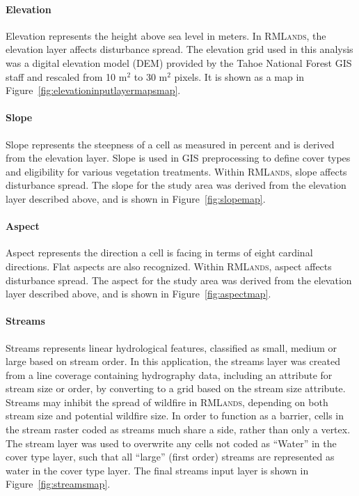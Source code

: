 \paragraph{Elevation} 
Elevation represents the height above sea level in meters. In \textsc{RMLands}, the elevation layer affects disturbance spread. The elevation grid used in this analysis was a digital elevation model (DEM) provided by the Tahoe National Forest GIS staff and rescaled from 10 m$^2$ to 30 m$^2$ pixels. It is shown as a map in Figure~\ref{fig:elevationinputlayermapsmap}.



\paragraph{Slope} 
Slope represents the steepness of a cell as measured in percent and is derived from the elevation layer. Slope is used in GIS preprocessing to define cover types and eligibility for various vegetation treatments. Within \textsc{RMLands}, slope affects disturbance spread. The slope for the study area was derived from the elevation layer described above, and is shown in Figure~\ref{fig:slopemap}.


\paragraph{Aspect} Aspect represents the direction a cell is facing in terms of eight cardinal directions. Flat aspects are also recognized. Within \textsc{RMLands}, aspect affects disturbance spread. The aspect for the study area was derived from the elevation layer described above, and is shown in Figure~\ref{fig:aspectmap}. 


\paragraph{Streams} 
Streams represents linear hydrological features, classified as small, medium or large based on stream order. In this application, the streams layer was created from a line coverage containing hydrography data, including an attribute for stream size or order, by converting to a grid based on the stream size attribute. Streams may inhibit the spread of wildfire in \textsc{RMLands}, depending on both stream size and potential wildfire size. In order to function as a barrier, cells in the stream raster coded as streams much share a side, rather than only a vertex. The stream layer was used to overwrite any cells not coded as ``Water'' in the cover type layer, such that all ``large'' (first order) streams are represented as water in the cover type layer. The final streams input layer is shown in Figure~\ref{fig:streamsmap}.


